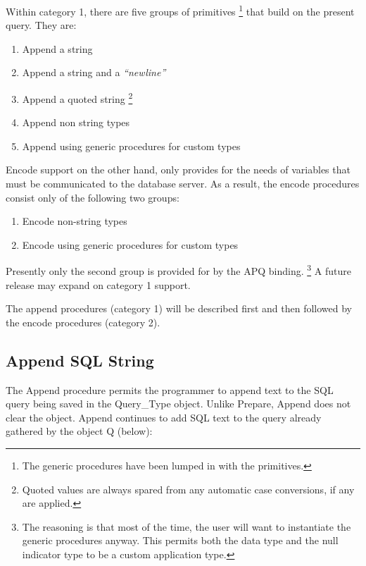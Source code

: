 \documentclass[english,letterpaper]{book}
\begin{document}
Within category 1, there are five groups of primitives%
\footnote{The generic procedures have been lumped in with the primitives.%
} that build on the present query. They are:

\begin{enumerate}
   \item Append a string
   \item Append a string and a \emph{{}``newline''}
   \item Append a quoted string%
      \footnote{Quoted values are always spared from any automatic case conversions,
      if any are applied.}
   \item Append non string types
   \item Append using generic procedures for custom types
\end{enumerate}

Encode support on the other hand, only provides for the needs of variables
that must be communicated to the database server. As a result, the
encode procedures consist only of the following two groups:

\begin{enumerate}
   \item Encode non-string types
   \item Encode using generic procedures for custom types
\end{enumerate}

Presently only the second group is provided for by the APQ binding.%
\footnote{The reasoning is that most of the time, the user will want to instantiate
the generic procedures anyway. This permits both the data type and
the null indicator type to be a custom application type.%
} A future release may expand on category 1 support.

The append procedures (category 1) will be described first and then
followed by the encode procedures (category 2).


\subsection{Append SQL String}

The Append procedure permits the programmer to append text to the
SQL query being saved in the Query\_Type object. Unlike Prepare,
Append does not clear the object. Append continues to add
SQL text to the query already gathered by the object Q (below):
\end{document}
